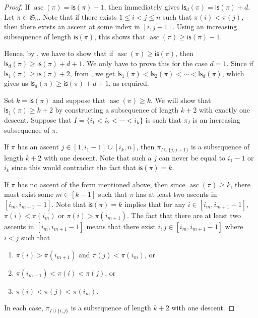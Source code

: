 \documentclass[12pt]{article}
\newcommand{\is}{\mathsf{is}}
\newcommand{\ls}{\mathsf{ls}}
\newcommand{\asc}{\operatorname{asc}}
\newcommand{\s}{\mathfrak{S}}
\theoremstyle{definition}
\begin{document}
\begin{proof}
    If $\asc(\pi) = \is(\pi) - 1$, then  immediately gives $\ls_d(\pi) = \is(\pi) + d$. 
    Let $\pi \in \s_n$. 
    Note that if there exists $1 \leq i < j \leq n$ such that $\pi(i) < \pi(j)$, then there exists an ascent at some index in $[i, j - 1]$. 
    Using an increasing subsequence of length $\is(\pi)$, this shows that $\asc(\pi) \geq \is(\pi) - 1$.
    
    Hence, by , we have to show that if $\asc(\pi) \geq \is(\pi)$, then $\ls_d(\pi) \geq \is(\pi) + d + 1$. 
    We only have to prove this for the case $d = 1$. 
    Since if $\ls_1(\pi) \geq \is(\pi) + 2$, from , we get $\ls_1(\pi) < \ls_2(\pi) < \cdots < \ls_d(\pi)$, which gives us $\ls_d(\pi) \geq \is(\pi) + d + 1$, as required.

    Set $k = \is(\pi)$ and suppose that $\asc(\pi) \geq k$. 
    We will show that $\ls_1(\pi) \geq k + 2$ by constructing a subsequence of length $k + 2$ with exactly one descent. 
    Suppose that $I = \{i_1 < i_2 < \cdots < i_k\}$ is such that $\pi_I$ is an increasing subsequence of $\pi$.

    If $\pi$ has an ascent $j \in [1, i_1 - 1] \cup [i_k, n]$, then $\pi_{I \cup \{j, j + 1\}}$ is a subsequence of length $k + 2$ with one descent. 
    Note that such a $j$ can never be equal to $i_1 - 1$ or $i_k$ since this would contradict the fact that $\is(\pi) = k$.

    If $\pi$ has no ascent of the form mentioned above, then since $\asc(\pi) \geq k$, there must exist some $m \in [k - 1]$ such that $\pi$ has at least two ascents in $[i_m, i_{m + 1} - 1]$. 
    Note that $\is(\pi) = k$ implies that for any $i \in [i_m, i_{m + 1} - 1]$, $\pi(i) < \pi(i_m)$ or $\pi(i) > \pi(i_{m + 1})$. 
    The fact that there are at least two ascents in $[i_m, i_{m + 1} - 1]$ means that there exist $i, j \in [i_m, i_{m + 1} - 1]$ where $i < j$ such that
    \begin{enumerate}
        \item $\pi(i) > \pi(i_{m + 1})$ and $\pi(j) < \pi(i_m)$, or
        \item $\pi(i_{m + 1}) < \pi(i)< \pi(j)$, or
        \item $\pi(i) < \pi(j) < \pi(i_m)$.
    \end{enumerate}
    In each case, $\pi_{I \cup \{i, j\}}$ is a subsequence of length $k + 2$ with one descent.
\end{proof}
\end{document}
